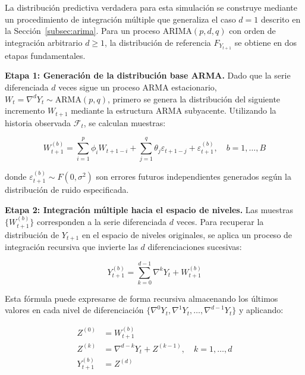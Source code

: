 La distribución predictiva verdadera para esta simulación se construye mediante un procedimiento de integración múltiple que generaliza el caso $d=1$ descrito en la Sección~\ref{subsec:arima}. Para un proceso ARIMA$(p,d,q)$ con orden de integración arbitrario $d \geq 1$, la distribución de referencia $F_{Y_{t+1}}$ se obtiene en dos etapas fundamentales.

\textbf{Etapa 1: Generación de la distribución base ARMA.} Dado que la serie diferenciada $d$ veces sigue un proceso ARMA estacionario, $W_t = \nabla^d Y_t \sim \text{ARMA}(p,q)$, primero se genera la distribución del siguiente incremento $W_{t+1}$ mediante la estructura ARMA subyacente. Utilizando la historia observada $\mathcal{F}_t$, se calculan muestras:

\begin{equation}
W_{t+1}^{(b)} = \sum_{i=1}^p \phi_i W_{t+1-i} + \sum_{j=1}^q \theta_j \varepsilon_{t+1-j} + \varepsilon_{t+1}^{(b)}, \quad b = 1, \ldots, B
\label{eq:multid_arma_samples}
\end{equation}

donde $\varepsilon_{t+1}^{(b)} \sim F(0, \sigma^2)$ son errores futuros independientes generados según la distribución de ruido especificada.

\textbf{Etapa 2: Integración múltiple hacia el espacio de niveles.} Las muestras $\{W_{t+1}^{(b)}\}$ corresponden a la serie diferenciada $d$ veces. Para recuperar la distribución de $Y_{t+1}$ en el espacio de niveles originales, se aplica un proceso de integración recursiva que invierte las $d$ diferenciaciones sucesivas:

\begin{equation}
Y_{t+1}^{(b)} = \sum_{k=0}^{d-1} \nabla^k Y_t + W_{t+1}^{(b)}
\label{eq:multid_integration}
\end{equation}

Esta fórmula puede expresarse de forma recursiva almacenando los últimos valores en cada nivel de diferenciación $\{\nabla^0 Y_t, \nabla^1 Y_t, \ldots, \nabla^{d-1} Y_t\}$ y aplicando:

\begin{equation}
\begin{aligned}
Z^{(0)} &= W_{t+1}^{(b)} \\
Z^{(k)} &= \nabla^{d-k} Y_t + Z^{(k-1)}, \quad k = 1, \ldots, d \\
Y_{t+1}^{(b)} &= Z^{(d)}
\end{aligned}
\label{eq:multid_recursive_integration}
\end{equation}

